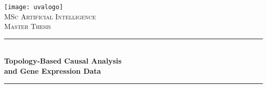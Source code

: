 
\begin{titlepage}



    \newcommand{\HRule}{\rule{\linewidth}{0.5mm}} %
    
    \center %
    
     
    
    
    
    
    
    
    \texttt{[image: uvalogo]}\\[2.5cm]
    
    \textsc{\Large MSc Artificial Intelligence}\\[0.2cm]
    
    \textsc{\Large Master Thesis}\\[0.5cm] 
    
    
    
    
    
    
    
    
    \HRule \\[0.4cm]
    
    { \huge \bfseries Topology-Based Causal Analysis \\ and Gene Expression Data}\\[0.4cm] %
    
    \HRule \\[0.5cm]
    
     
    
    
    
    

\end{titlepage}
